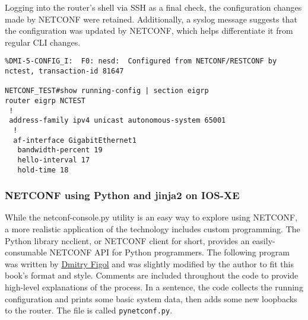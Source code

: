 Logging into the router's shell via SSH as a final check, the configuration
changes made by NETCONF were retained. Additionally, a syslog message suggests
that the configuration was updated by NETCONF, which helps differentiate it
from regular CLI changes.

\begin{verbatim}
%DMI-5-CONFIG_I:  F0: nesd:  Configured from NETCONF/RESTCONF by nctest, transaction-id 81647

NETCONF_TEST#show running-config | section eigrp
router eigrp NCTEST
 !
 address-family ipv4 unicast autonomous-system 65001
  !
  af-interface GigabitEthernet1
   bandwidth-percent 19
   hello-interval 17
   hold-time 18
\end{verbatim}

\subsubsection{NETCONF using Python and jinja2 on IOS-XE}
While the netconf-console.py utility is an easy way to explore using NETCONF,
a more realistic application of the technology includes custom programming.
The Python library ncclient, or NETCONF client for short, provides an
easily-consumable NETCONF API for Python programmers. The following program
was written by \href{https://twitter.com/dmfigol}{Dmitry Figol} and was
slightly modified by the author to fit this book's format and style. Comments
are included throughout the code to provide high-level explanations of the
process. In a sentence, the code collects the running configuration and prints
some basic system data, then adds some new loopbacks to the router. The file
is called \verb|pynetconf.py|.

